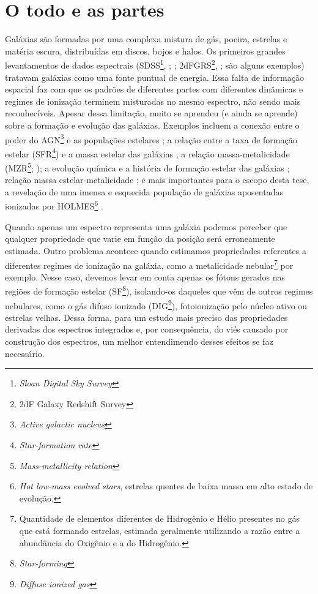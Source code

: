 \section{O todo e as partes}
\label{sec:intro:partes}

Galáxias são formadas por uma complexa mistura de gás, poeira, estrelas e matéria escura, distribuídas em discos, bojos e halos. Os primeiros grandes levantamentos de dados espectrais (SDSS\footnote{\em Sloan Digital Sky Survey}, \citealt{York.etal.2000a};
\citealt{Scoville.etal.2007}; 2dFGRS\footnote{2dF Galaxy Redshift Survey}, \citealt{Colless.etal.2001a}; são alguns exemplos) tratavam galáxias como uma fonte puntual de energia. Essa falta de informação espacial faz com que os padrões de diferentes partes com diferentes dinâmicas e regimes de ionização terminem misturadas no mesmo espectro, não sendo mais reconhecíveis. Apesar dessa limitação, muito se aprendeu (e ainda se aprende) sobre a formação e evolução das galáxias. Exemplos incluem a conexão entre o poder do AGN\footnote{\em Active galactic nucleus} e as populações estelares \citep{Kauffmann.etal.2003a}; a relação entre a taxa de formação estelar (SFR\footnote{\em Star-formation rate}) e a massa estelar das galáxias \citep{Brinchmann.etal.2004a}; a relação massa-metalicidade (MZR\footnote{\em Mass-metallicity relation}; \citealt{Tremonti.etal.2004a}); a evolução química e a história de formação estelar das galáxias \citep{CidFernandes.etal.2007, Asari.etal.2007a}; relação massa estelar-metalicidade \citep{ValeAsari.etal.2009a}; e mais importantes para o escopo desta tese, a revelação de uma imensa e esquecida população de galáxias aposentadas ionizadas por HOLMES\footnote{{\em Hot low-mass evolved stars}, estrelas quentes de baixa massa em alto estado de evolução.} \citep{Stasinska.etal.2008a, CidFernandes.etal.2010a, CidFernandes.etal.2011a}.

Quando apenas um espectro representa uma galáxia podemos perceber que qualquer propriedade que varie em função da posição será erroneamente estimada. Outro problema acontece quando estimamos propriedades referentes a diferentes regimes de ionização na galáxia, como a metalicidade nebular\footnote{Quantidade de elementos diferentes de Hidrogênio e Hélio presentes no gás que está formando estrelas, estimada geralmente utilizando a razão entre a abundância do Oxigênio e a do Hidrogênio.} por exemplo. Nesse caso, devemos levar em conta apenas os fótons gerados nas regiões de formação estelar (SF\footnote{{\em Star-forming}}), isolando-os daqueles que vêm de outros regimes nebulares, como o gás difuso ionizado (DIG\footnote{{\em Diffuse ionized gas}}), fotoionização pelo núcleo ativo ou estrelas velhas. Dessa forma, para um estudo mais preciso das propriedades derivadas dos espectros integrados e, por consequência, do viés causado por construção dos espectros, um melhor entendimendo desses efeitos se faz necessário.

